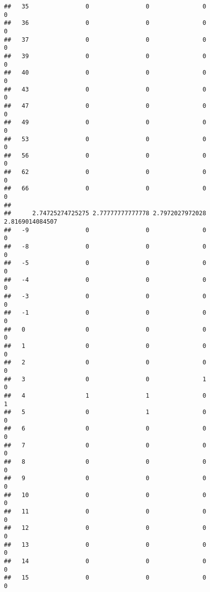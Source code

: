 \documentclass[]{article}
\begin{document}
\begin{verbatim}
##   35                0                0               0                0
##   36                0                0               0                0
##   37                0                0               0                0
##   39                0                0               0                0
##   40                0                0               0                0
##   43                0                0               0                0
##   47                0                0               0                0
##   49                0                0               0                0
##   53                0                0               0                0
##   56                0                0               0                0
##   62                0                0               0                0
##   66                0                0               0                0
##     
##      2.74725274725275 2.77777777777778 2.7972027972028 2.8169014084507
##   -9                0                0               0               0
##   -8                0                0               0               0
##   -5                0                0               0               0
##   -4                0                0               0               0
##   -3                0                0               0               0
##   -1                0                0               0               0
##   0                 0                0               0               0
##   1                 0                0               0               0
##   2                 0                0               0               0
##   3                 0                0               1               0
##   4                 1                1               0               1
##   5                 0                1               0               0
##   6                 0                0               0               0
##   7                 0                0               0               0
##   8                 0                0               0               0
##   9                 0                0               0               0
##   10                0                0               0               0
##   11                0                0               0               0
##   12                0                0               0               0
##   13                0                0               0               0
##   14                0                0               0               0
##   15                0                0               0               0

\end{verbatim}
\end{document}
